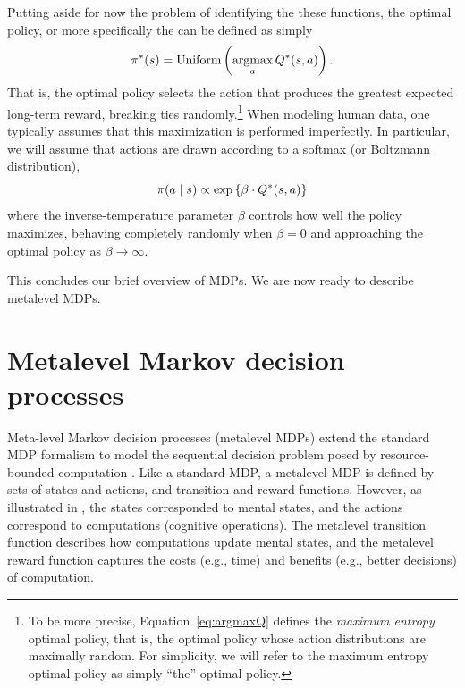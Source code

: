 Putting aside for now the problem of identifying the these functions, the optimal policy, or more specifically the can be defined as simply
%
\begin{equation}\label{eq:argmaxQ}
  \pi^*(s) = \text{Uniform}\left(\operatorname*{argmax}_a Q^*(s, a)\right).
\end{equation}
%
That is, the optimal policy selects the action that produces the greatest expected long-term reward, breaking ties randomly.\footnote{%
  To be more precise, Equation~\ref{eq:argmaxQ} defines the \emph{maximum entropy} optimal policy, that is, the optimal policy whose action distributions are maximally random. For simplicity, we will refer to the maximum entropy optimal policy as simply ``the'' optimal policy.
} When modeling human data, one typically assumes that this maximization is performed imperfectly. In particular, we will assume that actions are drawn according to a softmax (or Boltzmann distribution),
%
\begin{equation}\label{eq:softoptimal}
  \pi(a \mid s) \propto \exp\left\{\beta \cdot Q^*(s, a)\right\}
\end{equation}
%
where the inverse-temperature parameter $\beta$ controls how well the policy maximizes, behaving completely randomly when $\beta = 0$ and approaching the optimal policy as $\beta \rightarrow \infty$.

This concludes our brief overview of MDPs. We are now ready to describe metalevel MDPs.


\section{Metalevel Markov decision processes}


Meta-level Markov decision processes (metalevel MDPs) extend the standard MDP formalism to model the sequential decision problem posed by resource-bounded computation \citep{hay2012selecting}. Like a standard MDP, a metalevel MDP is defined by sets of states and actions, and transition and reward functions. However, as illustrated in , the states corresponded to mental states, and the actions correspond to computations (cognitive operations). The metalevel transition function describes how computations update mental states, and the metalevel reward function captures the costs (e.g., time) and benefits (e.g., better decisions) of computation.

